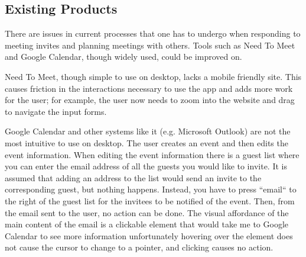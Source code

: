 \documentclass{sigchi}
\begin{document}
\subsection{Existing Products}

There are issues in current processes that one has to undergo when responding to meeting invites and planning meetings with others. Tools such as Need To Meet and Google Calendar, though widely used, could be improved on.

Need To Meet, though simple to use on desktop, lacks a mobile friendly site. This causes friction in the interactions necessary to use the app and adds more work for the user; for example, the user now needs to zoom into the website and drag to navigate the input forms. 

Google Calendar and other systems like it (e.g. Microsoft Outlook) are not the most intuitive to use on desktop. The user creates an event and then edits the event information. When editing the event information there is a guest list where you can enter the email address of all the guests you would like to invite. It is assumed that adding an address to the list would send an invite to the corresponding guest, but nothing happens. Instead, you have to press ``email`` to the right of the guest list for the invitees to be notified of the event. Then, from the email sent to the user, no action can be done. The visual affordance of the main content of the email is a clickable element that would take me to Google Calendar to see more information \textemdash unfortunately hovering over the element does not cause the cursor to change to a pointer, and clicking causes no action. 
\end{document}
